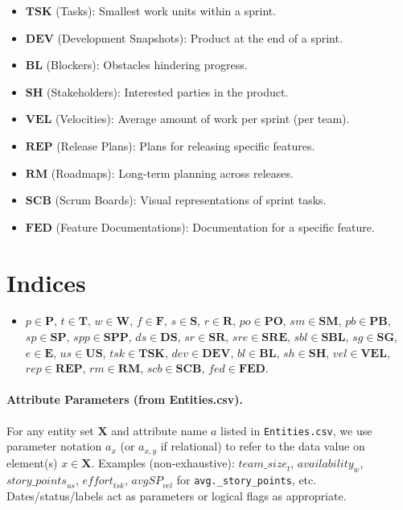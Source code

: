 \documentclass[11pt,a4paper]{article}
\begin{document}
\begin{itemize}[leftmargin=2em]
  \item $\mathbf{TSK}$ (Tasks): Smallest work units within a sprint.
  \item $\mathbf{DEV}$ (Development Snapshots): Product at the end of a sprint.
  \item $\mathbf{BL}$ (Blockers): Obstacles hindering progress.
  \item $\mathbf{SH}$ (Stakeholders): Interested parties in the product.
  \item $\mathbf{VEL}$ (Velocities): Average amount of work per sprint (per team).
  \item $\mathbf{REP}$ (Release Plans): Plans for releasing specific features.
  \item $\mathbf{RM}$ (Roadmaps): Long-term planning across releases.
  \item $\mathbf{SCB}$ (Scrum Boards): Visual representations of sprint tasks.
  \item $\mathbf{FED}$ (Feature Documentations): Documentation for a specific feature.
\end{itemize}

\section{Indices}
\begin{itemize}[leftmargin=2em]
  \item $p \in \mathbf{P}$, $t \in \mathbf{T}$, $w \in \mathbf{W}$, $f \in \mathbf{F}$, $s \in \mathbf{S}$, $r \in \mathbf{R}$,
        $po \in \mathbf{PO}$, $sm \in \mathbf{SM}$, $pb \in \mathbf{PB}$, $sp \in \mathbf{SP}$,
        $spp \in \mathbf{SPP}$, $ds \in \mathbf{DS}$, $sr \in \mathbf{SR}$, $sre \in \mathbf{SRE}$,
        $sbl \in \mathbf{SBL}$, $sg \in \mathbf{SG}$, $e \in \mathbf{E}$, $us \in \mathbf{US}$,
        $tsk \in \mathbf{TSK}$, $dev \in \mathbf{DEV}$, $bl \in \mathbf{BL}$, $sh \in \mathbf{SH}$,
        $vel \in \mathbf{VEL}$, $rep \in \mathbf{REP}$, $rm \in \mathbf{RM}$, $scb \in \mathbf{SCB}$, $fed \in \mathbf{FED}$.
\end{itemize}

\paragraph{Attribute Parameters (from Entities.csv).}
For any entity set $\mathbf{X}$ and attribute name $a$ listed in \texttt{Entities.csv}, we use parameter notation $a_{x}$ (or $a_{x,y}$ if relational) to refer to the data value on element(s) $x \in \mathbf{X}$.
Examples (non-exhaustive): $\textit{team\_size}_t$, $\textit{availability}_w$, $\textit{story\_points}_{us}$, $\textit{effort}_{tsk}$, $\textit{avgSP}_{vel}$ for \texttt{avg.\_story\_points}, etc. Dates/status/labels act as parameters or logical flags as appropriate.
\end{document}

